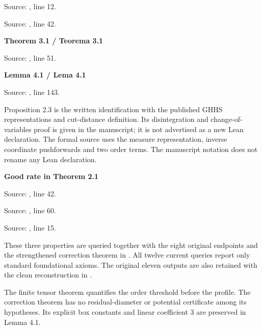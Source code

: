\documentclass[english,11pt,a4paper]{article}
\begin{document}

Source: , line 12.


Source: , line 42.

\textbf{Theorem 3.1 / Teorema 3.1}


Source: , line 51.

\textbf{Lemma 4.1 / Lema 4.1}


Source: , line 143.

Proposition 2.3 is the written identification with the published GHHS representations and cut-distance definition. Its disintegration and change-of-variables proof is given in the manuscript; it is not advertised as a new Lean declaration. The formal source uses the measure representation, inverse coordinate pushforwards and two order terms. The manuscript notation does not rename any Lean declaration.

\textbf{Good rate in Theorem 2.1}


Source: , line 42.


Source: , line 60.


Source: , line 15.

These three properties are queried together with the eight original endpoints and the strengthened correction theorem in . All twelve current queries report only standard foundational axioms. The original eleven outputs are also retained with the clean reconstruction in .

The finite tensor theorem quantifies the order threshold before the profile. The correction theorem has no residual-diameter or potential certificate among its hypotheses. Its explicit box constants and linear coefficient 3 are preserved in Lemma 4.1.
\end{document}
